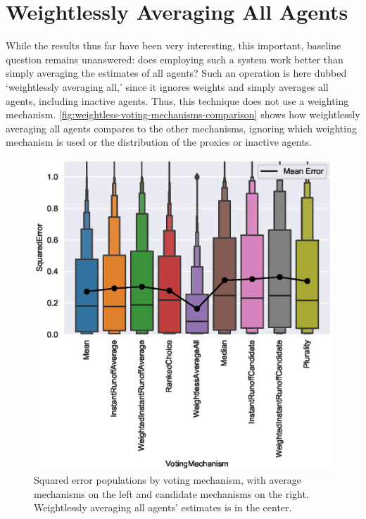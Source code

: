 \section{Weightlessly Averaging All Agents}\label{sec:weightless-average-all}
While the results thus far have been very interesting, this important, baseline
question remains unanswered: does employing such a system work better than simply
averaging the estimates of all agents?
Such an operation is here dubbed `weightlessly averaging all,' since it ignores
weights and simply averages all agents, including inactive agents.
Thus, this technique does not use a weighting mechanism.
\autoref{fig:weightless-voting-mechanisms-comparison} shows how weightlessly
averaging all agents compares to the other mechanisms, ignoring which weighting
mechanism is used or the distribution of the proxies or inactive agents.

\begin{figure}[htbp]
    \centering
    \includegraphics[scale=0.75]
    {./content/figures/weightless/weightless_voting_mechanisms_comparison}
    \caption{Squared error populations by voting mechanism, with average
    mechanisms on the left and candidate mechanisms on the right.
    Weightlessly averaging all agents' estimates is in the center.}
    \label{fig:weightless-voting-mechanisms-comparison}
\end{figure}

